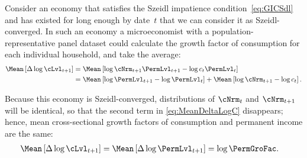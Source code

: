 \documentclass[BufferStockTheory]{subfiles}
\begin{document}
Consider an economy that satisfies the Szeidl impatience condition~\eqref{eq:GICSdl} and has existed for long enough by date~$t$ that we can consider it as Szeidl-converged.  In such an economy a microeconomist with a population-representative panel dataset could calculate the growth factor of consumption for each individual household, and take the average:
\begin{equation}\label{eq:MeanDeltaLogC}
  \begin{split}
    \Mean\left[\Delta \log \cLvl_{t+1}\right]  & = \Mean\left[ \log {\cNrm}_{t+1}\PermLvl_{t+1} - \log c_{t}\PermLvl_{t}\right]  \\
    & = \Mean\left[ \log \PermLvl_{t+1}- \log \PermLvl_{t}\right] + \Mean\left[ \log {\cNrm}_{t+1} - \log c_{t}\right].
  \end{split}
\end{equation}

Because this economy is Szeidl-converged, distributions of $\cNrm_{t}$ and $\cNrm_{t+1}$ will be identical, so that the second term in  \eqref{eq:MeanDeltaLogC} disappears; hence, mean cross-sectional growth factors of consumption and permanent income are the same:
\begin{align}
  \Mean\left[\Delta \log \cLvl_{t+1}\right]  & = \Mean\left[ \Delta \log \PermLvl_{t+1}\right] = \log \PermGroFac \label{eq:MeanDeltaLogCeqMeanDeltaLogP}.
\end{align}
\end{document}
